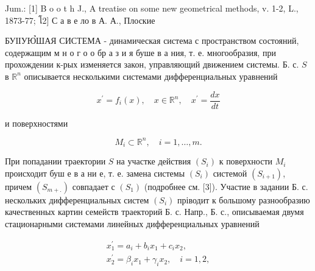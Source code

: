 \documentclass[10pt]{article}
\begin{document}
Jum.: [1] B o o t h J., A treatise on some new geometrical methods, v. 1-2, L., 1873-77; โ2] С а в е ло в А. А., Плоские



БУІІУЮ̉ШАЯ СИСТЕМА - динамическая система с пространством состояний, содержащим м н о г о о бр а з и я буше в а ния, т. е. многообразия, при прохождении к-рых изменяется закон, управляющий движением системы. Б. с. $S$ в $\mathbb{R}^{n}$ описывается несколькими системами дифференциальных уравнений



\[

x^{\prime}=f_{i}(x), \quad x \in \mathbb{R}^{n}, \quad x^{\prime}=\frac{d x}{d t}

\]



и поверхностями



\[

M_{i} \subset \mathbb{R}^{n}, \quad i=1, \ldots, m .

\]



При попадании траектории $S$ на участке действия $\left(S_{i}\right)$ к поверхности $M_{i}$ происходит буш е в а ни е, т. е. замена системы $\left(S_{i}\right)$ системой $\left(S_{i+1}\right)$, причем $\left(S_{m+.}\right)$ совпадает с $\left(S_{1}\right)$ (подробнее см. [3]). Участие в задании Б. с. нескольких дифференциальных систем $\left(S_{i}\right)$ пріводит к большому разнообразию качественных картин семейств траекторий Б. с. Напр., Б. с., описываемая двумя стационарными системами линейных дифференциальных уравнений



\[

\begin{gathered}

x_{1}^{\prime}=a_{i}+b_{i} x_{1}+c_{i} x_{2}, \\

x_{2}^{\prime}=\beta_{i} x_{1}+\gamma_{i} x_{2}, \quad i=1,2,

\end{gathered}

\]
\end{document}
